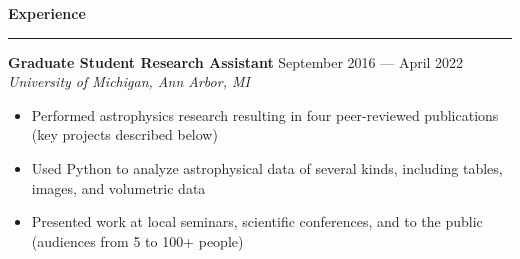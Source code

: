 \documentclass[10pt]{article}
\newcommand{\header}[1]{\vspace{0.7em}\par \textbf{\large #1}\strut\hrule\vspace{-0.6em}}
\newcommand{\actionHeader}[2]{\vspace{0.3em}\textbf{#1} \hfill #2}
\newcommand{\actionHeaderSecondLine}[2]{\newline \textit{#1} \hfill #2}
\begin{document}
\header{Experience}
\actionHeader{Graduate Student Research Assistant}{September 2016 --- April 2022}
\actionHeaderSecondLine{University of Michigan, Ann Arbor, MI}{}
\begin{itemize}
    \item Performed astrophysics research resulting in four peer-reviewed publications (key projects described below)
    \item Used Python to analyze astrophysical data of several kinds, including tables, images, and volumetric data
    \item Presented work at local seminars, scientific conferences, and to the public (audiences from 5 to 100+ people)
\end{itemize}

\end{document}
